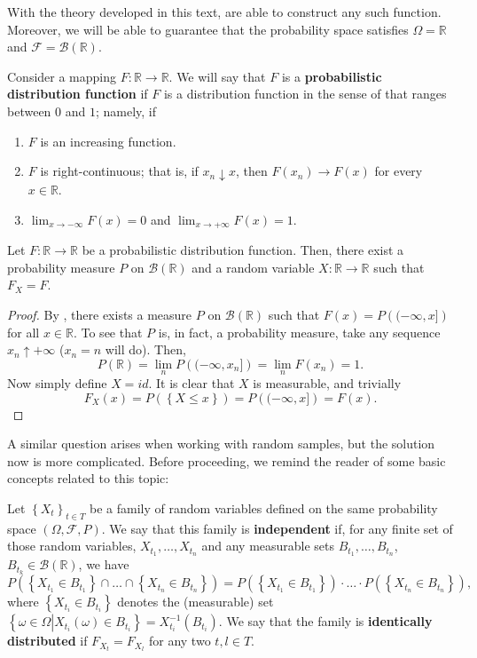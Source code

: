 With the theory developed in this text, are able to construct any such function. Moreover, we will be able to guarantee that the probability space satisfies \(\Omega=\mathbb{R}\) and \(\mathcal{F}=\mathscr{B}\left(\mathbb{R}\right)\).
\begin{defn}
		Consider a mapping \(F\colon \mathbb{R}\to \mathbb{R}\). We will say that \(F\) is a \textbf{probabilistic distribution function} if \(F\) is a distribution function in the sense of  that ranges between \(0\) and \(1\); namely, if
		\begin{enumerate}
				\item \(F\) is an increasing function.
				\item \(F\) is right-continuous; that is, if \(x_n\downarrow x\), then \(F(x_n)\to F(x)\) for every \(x\in\mathbb{R}\).
				\item \(\lim_{x\to-\infty}F(x)=0\) and \(\lim_{x\to+\infty}F(x)=1\).
		\end{enumerate}
\end{defn}
\begin{prop}
		Let \(F\colon \mathbb{R}\to \mathbb{R} \) be a probabilistic distribution function. Then, there exist a probability measure \(P\) on \(\mathscr{B}\left(\mathbb{R}\right)\) and a random variable \(X\colon \mathbb{R}\to \mathbb{R} \) such that \(F_X=F\).
\end{prop}
\begin{proof}
		By , there exists a measure \(P\) on \(\mathscr{B}\left(\mathbb{R}\right)\) such that \(F(x)=P\left( (-\infty,x]\right)\) for all \(x\in\mathbb{R}\). To see that \(P\) is, in fact, a probability measure, take any sequence \(x_n\uparrow +\infty\) (\(x_n=n\) will do). Then,
\[
		P(\mathbb{R})=\lim_nP\left( (-\infty,x_n]\right)=\lim_nF(x_n)=1
.\]
		Now simply define \(X=id\). It is clear that \(X\) is measurable, and trivially
		\[
				F_X(x)=P\left(\left\{X\leq x\right\}\right)=P\left( (-\infty,x]\right)=F(x)
		.\]
\end{proof}

A similar question arises when working with random samples, but the solution now is more complicated. Before proceeding, we remind the reader of some basic concepts related to this topic:

Let \(\left\{X_t\right\}_{t\in T}\) be a family of random variables defined on the same probability space \(\left(\Omega,\mathcal{F},P\right)\). We say that this family is \textbf{independent} if, for any finite set of those random variables, \(X_{t_1},\dots,X_{t_n}\) and any measurable sets \(B_{t_1},\dots,B_{t_n}\), \(B_{t_k}\in\mathscr{B}\left(\mathbb{R}\right)\), we have
\[
P\left(\left\{X_{t_1}\in B_{t_1}\right\}\cap\dotsc\cap\left\{X_{t_n}\in B_{t_n}\right\}\right)=P\left(\left\{X_{t_1}\in B_{t_1}\right\}\right)\cdot\dotsc\cdot P\left(\left\{X_{t_n}\in B_{t_n}\right\}\right)
,\]
where \(\left\{X_{t_i}\in B_{t_i}\right\}\) denotes the (measurable) set \(\left\{\omega\in\Omega\left|X_{t_i}(\omega)\in B_{t_i}\right.\right\}=X_{t_i}^{-1}(B_{t_i})\). We say that the family is \textbf{identically distributed} if \(F_{X_t}=F_{X_l}\) for any two \(t,l\in T\). 

